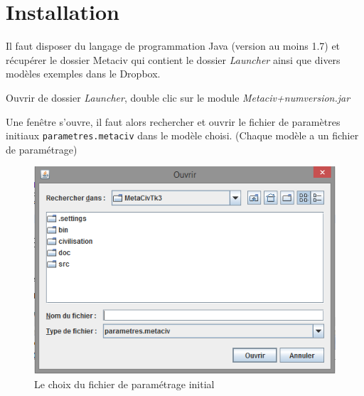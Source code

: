 \documentclass[a4paper,oneside,12 pt]{article}
\begin{document}
\section{Installation}

Il faut disposer du langage de programmation Java (version au moins 1.7) et récupérer le dossier Metaciv qui contient le dossier \textit{Launcher} ainsi que divers modèles exemples dans le Dropbox.

Ouvrir de dossier \textit{Launcher}, double clic sur le module \textit{Metaciv+numversion.jar}


Une fenêtre s'ouvre, il faut alors rechercher et ouvrir le fichier de paramètres initiaux  \texttt{parametres.metaciv} dans le modèle choisi. (Chaque modèle a un fichier de paramétrage)



\begin{figure}[hbtp]
\begin{center}
 \includegraphics [scale=0.4] {ecran1.png}
\end{center}
 \caption{Le choix du fichier de paramétrage initial}
\end{figure}

\end{document}
